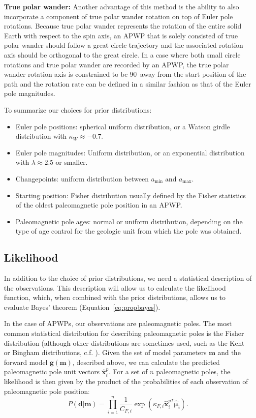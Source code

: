 \documentclass[]{agujournal2019}
\begin{document}
\textbf{True polar wander:}
Another advantage of this method is the ability to also incorporate a component of true polar wander rotation on top of Euler pole rotations. Because true polar wander represents the rotation of the entire solid Earth with respect to the spin axis, an APWP that is solely consisted of true polar wander should follow a great circle trajectory and the associated rotation axis should be orthogonal to the great circle. In a case where both small circle rotations and true polar wander are recorded by an APWP, the true polar wander rotation axis is constrained to be 90\textdegree\ away from the start position of the path and the rotation rate can be defined in a similar fashion as that of the Euler pole magnitudes.


To summarize our choices for prior distributions:
\begin{itemize}
\item Euler pole positions: spherical uniform distribution, or a Watson girdle distribution with $\kappa_W \approx -0.7$.
\item Euler pole magnitudes: Uniform distribution, or an exponential distribution with $\lambda \approx 2.5$ or smaller.
\item Changepoints: uniform distribution between $a_\mathrm{min}$ and $a_\mathrm{max}$.
\item Starting position: Fisher distribution usually defined by the Fisher statistics of the oldest paleomagnetic pole position in an APWP.
\item Paleomagnetic pole ages: normal or uniform distribution, depending on the type of age control for the geologic unit from which the pole was obtained.
\end{itemize}

\subsection{Likelihood}
\label{sec:likelihood}
In addition to the choice of prior distributions, we need a statistical description of the observations. This description will allow us to calculate the likelihood function, which, when combined with the prior distributions, allows us to evaluate Bayes' theorem (Equation~\ref{eq:propbayes}).

In the case of APWPs, our observations are paleomagnetic poles. The most common statistical distribution for describing paleomagnetic poles is the Fisher distribution (although other distributions are sometimes used, such as the Kent or Bingham distributions, c.f. ). Given the set of model parameters $\mathbf{m}$ and the forward model $\mathbf{g}(\mathbf{m})$, described above, we can calculate the predicted paleomagnetic pole unit vectors $\hat{\mathbf{x}}_i^p$. For a set of $n$ paleomagnetic poles, the likelihood is then given by the product of the probabilities of each observation of paleomagnetic pole position:
\begin{equation}
P(\mathbf{d} \vert \mathbf{m}) = \displaystyle\prod_{i=1}^n \frac{1}{C_{F,i}} \exp \left( \kappa_{F,i} \hat{\mathbf{x}}_{i}^{pT} \hat{\mathbf{\mu}}_i \right).
\label{eq:model_likelihood}
\end{equation}
\end{document}
